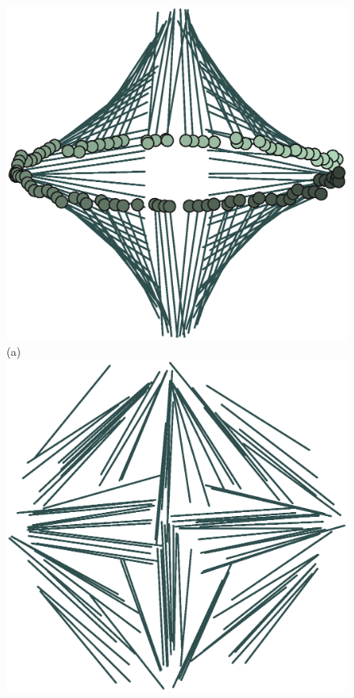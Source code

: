 \begin{figure}[!t]
	\centering
	\begin{minipage}[t]{0.25\textwidth}
		\centering
		\includegraphics[width=0.9\columnwidth]{./figs/minusone_reruns_0_alt.eps}\\
		(a)\\ \vspace{0.5cm}
		\includegraphics[width=0.9\columnwidth]{./figs/minusone_reruns_1_alt.eps}\\

\end{minipage}
\end{figure}
